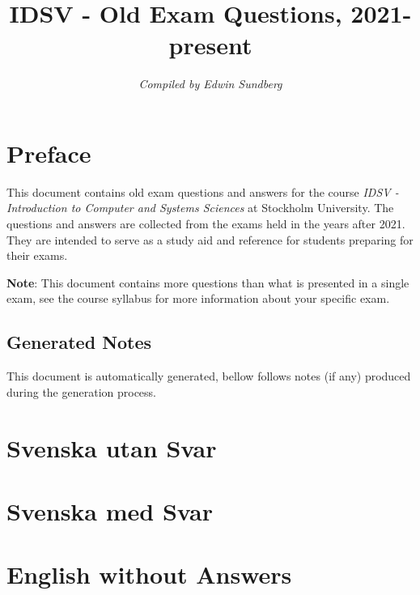 \documentclass[a4paper,11pt,oneside]{article}
\title{IDSV - Old Exam Questions, 2021-present}
\author{\textit{Compiled by Edwin Sundberg}}
\begin{document}
\maketitle \pagebreak

\begin{sloppypar}  

\tableofcontents \pagebreak

\section{Preface}
\label{preface}
This document contains old exam questions and answers for the course \textit{IDSV - Introduction to Computer and Systems Sciences} at Stockholm University. The questions and answers are collected from the exams held in the years after 2021. They are intended to serve as a study aid and reference for students preparing for their exams.


\textbf{Note}: This document contains more questions than what is presented in a single exam, see the course syllabus for more information about your specific exam.

\textsuperscript{}

\subsection{Generated Notes}
\label{generatedNotes}

This document is automatically generated, bellow follows notes (if any) produced during the generation process.



\section{Svenska utan Svar}
\label{svenskaUtanSvar}


\section{Svenska med Svar}
\label{svenska}


\section{English without Answers}
\label{englishWithoutAnswers}


\end{sloppypar}
\end{document}
